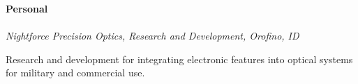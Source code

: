 \documentclass[10pt,letterpaper]{article}
\begin{document}
\vspace*{\fill}

{\indent\sc\bf Personal}\vspace{.5pc}\\
\indent{}	\hspace*{\fill}{ March 2018, current employer} \\
\indent\indent 	
{\sl Nightforce Precision Optics, Research and Development, Orofino, ID}
				\vspace{0.1in}
                 \begin{itemize}[leftmargin=0.75in, rightmargin=0.25in, topsep=0mm,itemindent=0mm, label=\textrm{--}]
  {\small\sl
\item Research and development for integrating electronic features into optical systems for military and commercial use. 

}
\end{itemize}

\vspace*{\fill}
   
\vspace*{\fill}

\noindent\makebox[\linewidth]{\rule{\linewidth}{0.4pt}}
\end{document}
